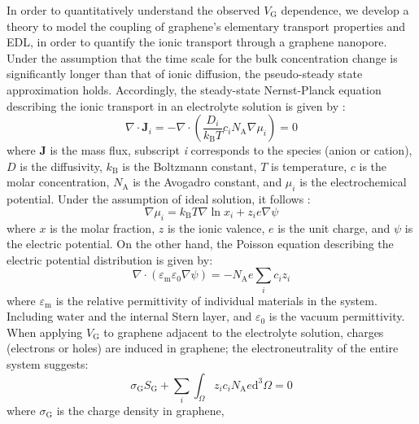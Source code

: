 \documentclass[journal=langd5,email=true, hyperref=true, keywords=false]{achemso}
\begin{document}
In order to quantitatively understand the observed $V_{\mathrm{G}}$
dependence, we develop a theory to model the coupling of graphene’s
elementary transport properties and EDL, in order to quantify the
ionic transport through a graphene nanopore. Under the assumption that
the time scale for the bulk concentration change is significantly
longer than that of ionic diffusion, the pseudo-steady state
approximation holds. Accordingly, the steady-state Nernst-Planck
equation describing the ionic transport in an electrolyte solution is
given by \cite{MacGillivray_1968}:
\begin{equation}
  \label{eq:pnp}
  \nabla \cdot \boldsymbol{J}_{i} = -\nabla \cdot (\frac{D_{i}}{k_{\mathrm{B}}T} c_{i} N_{\mathrm{A}} \nabla \mu_{i}) = 0
\end{equation}
where $\boldsymbol{J}$ is the mass flux, subscript \textit{i}
corresponds to the species (anion or cation), $D$ is the diffusivity,
$k_{\mathrm{B}}$ is the Boltzmann constant, $T$ is temperature, $c$ is
the molar concentration, $N_{\mathrm{A}}$ is the Avogadro constant,
and $\mu_{i}$ is the electrochemical potential. Under the assumption
of ideal solution, it follows \cite{Kilic_2007}:
\begin{equation}
  \label{eq:mu}
  \nabla \mu_{i} = k_{\mathrm{B}} T \nabla \ln x_{i} + z_{i} e \nabla \psi
\end{equation}
where $x$ is the molar fraction, $z$ is the ionic valence, $e$ is the
unit charge, and $\psi$ is the electric potential. On the other hand,
the Poisson equation describing the electric potential distribution is
given by:
\begin{equation}
  \label{eq:poisson}
  \nabla \cdot (\varepsilon_{\mathrm{m}} \varepsilon_{0} \nabla \psi)
  =
  - N_{\mathrm{A}} e \sum_{i} c_{i} z_{i}
\end{equation}
where $\varepsilon_{\mathrm{m}}$ is the relative permittivity of
individual materials in the system. Including water and the internal
Stern layer\cite{Tian_2017}, and
$\varepsilon_{0}$ is the vacuum permittivity. When applying
$V_{\mathrm{G}}$ to graphene adjacent to the electrolyte solution,
charges (electrons or holes) are induced in graphene; the
electroneutrality of the entire system suggests:
\begin{equation}
  \label{eq:electro-neutral}
  \sigma_{\mathrm{G}} S_{\mathrm{G}} + \sum_{i} \int_{\Omega} z_{i} c_{i} N_{\mathrm{A}} e \mathrm{d}^{3} \Omega= 0
\end{equation}
where $\sigma_{\mathrm{G}}$ is the charge density in graphene,
\end{document}
